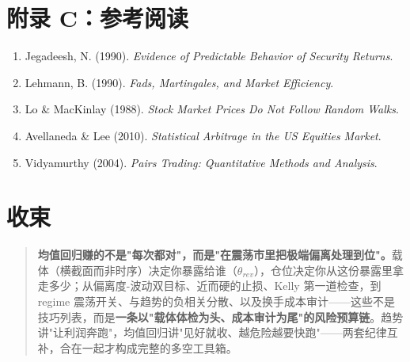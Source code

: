 \documentclass[UTF8,11pt]{ctexart}
\begin{document}
\section*{附录 C：参考阅读}
\begin{enumerate}[itemsep=2pt]
\item Jegadeesh, N. (1990). \emph{Evidence of Predictable Behavior of Security Returns}.
\item Lehmann, B. (1990). \emph{Fads, Martingales, and Market Efficiency}.
\item Lo \& MacKinlay (1988). \emph{Stock Market Prices Do Not Follow Random Walks}.
\item Avellaneda \& Lee (2010). \emph{Statistical Arbitrage in the US Equities Market}.
\item Vidyamurthy (2004). \emph{Pairs Trading: Quantitative Methods and Analysis}.
\end{enumerate}

\section*{收束}
\begin{quote}
\textbf{均值回归赚的不是"每次都对"，而是"在震荡市里把极端偏离处理到位"。}载体（横截面而非时序）决定你暴露给谁（$\theta_{rev}$），仓位决定你从这份暴露里拿走多少；从偏离度-波动双目标、近而硬的止损、Kelly 第一道检查，到 regime 震荡开关、与趋势的负相关分散、以及换手成本审计——这些不是技巧列表，而是\textbf{一条以"载体体检为头、成本审计为尾"的风险预算链}。趋势讲"让利润奔跑"，均值回归讲"见好就收、越危险越要快跑"——两套纪律互补，合在一起才构成完整的多空工具箱。
\end{quote}
\end{document}
